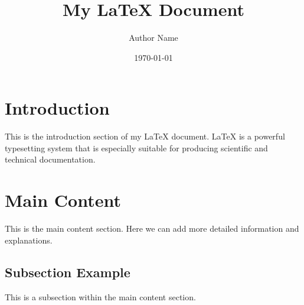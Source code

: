 \documentclass{article}
\title{My LaTeX Document}
\author{Author Name}
\date{\today}
\begin{document}
\maketitle

\section{Introduction}
This is the introduction section of my LaTeX document. LaTeX is a powerful typesetting system that is especially suitable for producing scientific and technical documentation.

\section{Main Content}
This is the main content section. Here we can add more detailed information and explanations.

\subsection{Subsection Example}
This is a subsection within the main content section.
\end{document}
